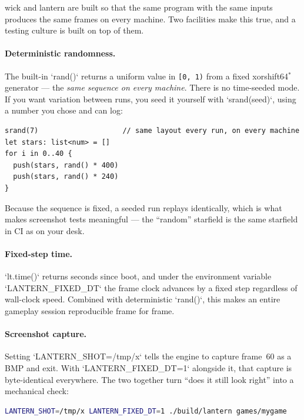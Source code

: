 wick and lantern are built so that the same program with the same inputs
produces the same frames on every machine. Two facilities make this true, and
a testing culture is built on top of them.

\paragraph{Deterministic randomness.} The built-in `rand()` returns a uniform
value in \texttt{[0, 1)} from a fixed \mbox{xorshift64$^{*}$} generator --- the
\emph{same sequence on every machine}. There is no time-seeded mode. If you
want variation between runs, you seed it yourself with `srand(seed)`, using a
number you chose and can log:

\begin{lstlisting}[language=wick]
srand(7)                    // same layout every run, on every machine
let stars: list<num> = []
for i in 0..40 {
  push(stars, rand() * 400)
  push(stars, rand() * 240)
}
\end{lstlisting}

\noindent
Because the sequence is fixed, a seeded run replays identically, which is what
makes screenshot tests meaningful --- the ``random'' starfield is the same
starfield in CI as on your desk.

\paragraph{Fixed-step time.} `lt.time()` returns seconds since boot, and under
the environment variable `LANTERN_FIXED_DT` the frame clock advances by a
fixed step regardless of wall-clock speed. Combined with deterministic
`rand()`, this makes an entire gameplay session reproducible frame for frame.

\paragraph{Screenshot capture.} Setting `LANTERN_SHOT=/tmp/x` tells the engine
to capture frame~60 as a BMP and exit. With `LANTERN_FIXED_DT=1` alongside it,
that capture is byte-identical everywhere. The two together turn ``does it
still look right'' into a mechanical check:

\begin{lstlisting}[language=bash,basicstyle=\ttfamily\small,keywordstyle={}]
LANTERN_SHOT=/tmp/x LANTERN_FIXED_DT=1 ./build/lantern games/mygame
\end{lstlisting}

